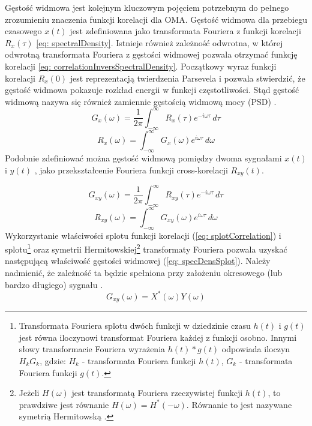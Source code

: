 Gęstość widmowa jest kolejnym kluczowym pojęciem potrzebnym do pełnego zrozumieniu znaczenia funkcji korelacji dla OMA. Gęstość widmowa  dla przebiegu czasowego $x(t)$ jest zdefiniowana jako transformata Fouriera z funkcji korelacji $R_x(\tau)$ \ref{eq: spectralDensity}. Istnieje również zależność odwrotna, w której odwrotną transformata Fouriera z gęstości widmowej pozwala otrzymać funkcję korelacji \ref{eq: correlationInversSpectralDensity}. Początkowy wyraz funkcji korelacji $R_x(0)$ jest reprezentacją twierdzenia Parsevela i pozwala stwierdzić, że gęstość widmowa pokazuje rozkład energii w funkcji częstotliwości. Stąd gęstość widmową nazywa się również zamiennie gęstością widmową mocy  (PSD) \parencite{Brincker2015}.
\begin{equation} \label{eq: spectralDensity}
	G_x(\omega) = \frac{1}{2\pi}\int_{-\infty}^{\infty}R_x(\tau)e^{-i\omega\tau}\,d\tau
\end{equation}
\begin{equation} \label{eq: correlationInversSpectralDensity}
	R_x(\omega) = \int_{-\infty}^{\infty}G_x(\omega)e^{i\omega\tau}\,d\omega
\end{equation}
Podobnie zdefiniować można gęstość widmową pomiędzy dwoma sygnałami $x(t)$ i $y(t)$ , jako przekształcenie Fouriera funkcji cross-korelacji $R_{xy}(t)$. 

\begin{equation} \label{eq: crossspectralDensity}
	G_{xy}(\omega) = \frac{1}{2\pi}\int_{-\infty}^{\infty}R_{xy}(\tau)e^{-i\omega\tau}\,d\tau
\end{equation}
\begin{equation} \label{eq: crosscorrelationInversSpectralDensity}
	R_{xy}(\omega) = \int_{-\infty}^{\infty}G_{xy}(\omega)e^{i\omega\tau}\,d\omega
\end{equation}
Wykorzystanie właściwości splotu funkcji korelacji (\ref{eq: splotCorrelation}) i  splotu\footnote{Transformata Fouriera splotu dwóch funkcji w dziedzinie czasu $h(t)$ i $g(t)$ jest równa iloczynowi transformat Fouriera każdej z funkcji osobno. Innymi słowy transformacie Fouriera wyrażenia $h(t)*g(t)$ odpowiada iloczyn $H_k G_k$, gdzie: $H_k$ - transformata Fouriera funkcji $h(t)$, $G_k$ - transformata Fouriera funkcji $g(t)$.} oraz symetrii Hermitowskiej\footnote{Jeżeli $H(\omega)$ jest transformatą Fouriera rzeczywistej funkcji $h(t)$, to prawdziwe jest równanie $H(\omega)=H^*(-\omega)$. Równanie to jest nazywane symetrią Hermitowską \parencite{Boashash2015}.} transformaty Fouriera pozwala uzyskać następującą właściwość gęstości widmowej (\ref{eq: specDensSplot}). Należy nadmienić, że zależność ta będzie spełniona przy założeniu okresowego (lub bardzo długiego) sygnału \parencite{Brincker2015}.
\begin{equation} \label{eq: specDensSplot}
	G_{xy}(\omega) = X^*(\omega)Y(\omega)
\end{equation}



